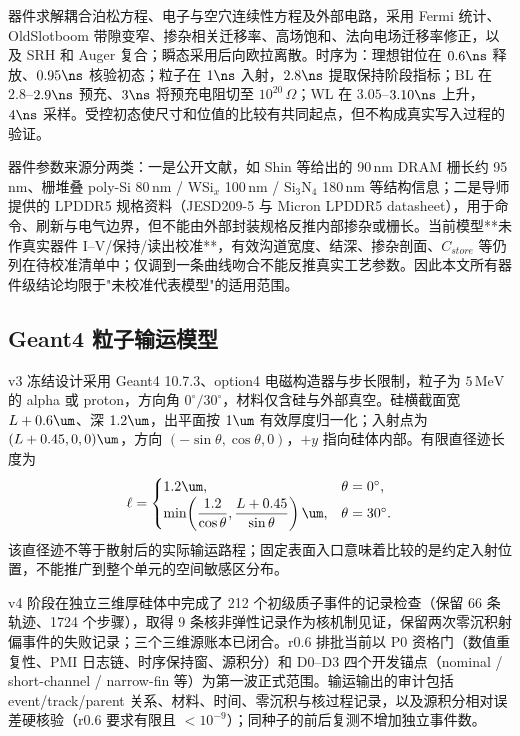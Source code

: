 器件求解耦合泊松方程、电子与空穴连续性方程及外部电路，采用 Fermi 统计、OldSlotboom 带隙变窄、掺杂相关迁移率、高场饱和、法向电场迁移率修正，以及 SRH 和 Auger 复合；瞬态采用后向欧拉离散。时序为：理想钳位在 $0.6\ns$ 释放、$0.95\ns$ 核验初态；粒子在 $1\ns$ 入射，$2.8\ns$ 提取保持阶段指标；BL 在 $2.8$--$2.9\ns$ 预充、$3\ns$ 将预充电阻切至 $10^{20}\,\Omega$；WL 在 $3.05$--$3.10\ns$ 上升，$4\ns$ 采样。受控初态使尺寸和位值的比较有共同起点，但不构成真实写入过程的验证。

器件参数来源分两类：一是公开文献，如 Shin 等给出的 90\,nm DRAM 栅长约 95\,nm、栅堆叠 poly-Si 80\,nm / WSi$_x$ 100\,nm / Si$_3$N$_4$ 180\,nm 等结构信息\cite{shin2003}；二是导师提供的 LPDDR5 规格资料（JESD209-5 与 Micron LPDDR5 datasheet），用于命令、刷新与电气边界，但不能由外部封装规格反推内部掺杂或栅长\cite{jesd209-5,micronlpddr5}。当前模型**未作真实器件 I--V/保持/读出校准**，有效沟道宽度、结深、掺杂剖面、$C_{store}$ 等仍列在待校准清单中；仅调到一条曲线吻合不能反推真实工艺参数。因此本文所有器件级结论均限于"未校准代表模型"的适用范围。

\subsection{Geant4 粒子输运模型}

v3 冻结设计采用 Geant4 10.7.3、option4 电磁构造器与步长限制\cite{g4em}，粒子为 $5\,\text{MeV}$ 的 alpha 或 proton，方向角 $0^\circ/30^\circ$，材料仅含硅与外部真空。硅横截面宽 $L+0.6\um$、深 $1.2\um$，出平面按 $1\um$ 有效厚度归一化；入射点为 $(L+0.45,0,0)\um$，方向 $(-\sin\theta,\cos\theta,0)$，$+y$ 指向硅体内部。有限直径迹长度为
\begin{equation}
\ell=\begin{cases}
1.2\um, & \theta=0^\circ,\\
\min\!\left(\dfrac{1.2}{\cos\theta},\dfrac{L+0.45}{\sin\theta}\right)\um, & \theta=30^\circ.
\end{cases}
\label{eq:length}
\end{equation}
该直径迹不等于散射后的实际输运路程；固定表面入口意味着比较的是约定入射位置，不能推广到整个单元的空间敏感区分布。

v4 阶段在独立三维厚硅体中完成了 212 个初级质子事件的记录检查（保留 66 条轨迹、1724 个步骤），取得 9 条核非弹性记录作为核机制见证，保留两次零沉积射偏事件的失败记录；三个三维源账本已闭合。r0.6 排批当前以 P0 资格门（数值重复性、PMI 日志链、时序保持窗、源积分）和 D0--D3 四个开发锚点（nominal / short-channel / narrow-fin 等）为第一波正式范围。输运输出的审计包括 event/track/parent 关系、材料、时间、零沉积与核过程记录，以及源积分相对误差硬核验（r0.6 要求有限且 $<10^{-9}$）；同种子的前后复测不增加独立事件数。

